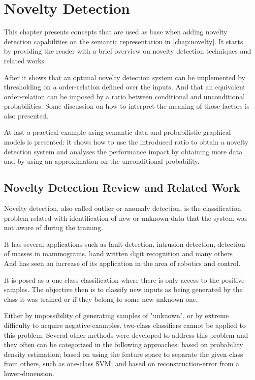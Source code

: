 \chapter{Novelty Detection}\label{chap:novelty-intro}

This chapter presents concepts that are used as base when adding novelty
detection capabilities on the semantic representation in \autoref{chap:novelty}.
It starts by providing the reader with a brief overview on novelty detection
techniques and related works.

After it shows that an optimal novelty detection system can be implemented by
thresholding on a order-relation defined over the inputs.
And that an equivalent order-relation can be imposed by a ratio between
conditional and unconditional probabilities.
Some discussion on how to interpret the meaning of those factors is also
presented.

At last a practical example using semantic data and probabilistic graphical
models is presented: it shows how to use the introduced ratio to obtain a
novelty detection system and analyses the performance impact by obtaining more
data and by using an approximation on the unconditional probability.


\section{Novelty Detection Review and Related Work}
%
%
%

Novelty detection, also called outlier or anomaly detection, is the
classification problem related with identification of new or unknown data that
the system was not aware of during the training.

It has several applications such as fault detection, intrusion detection,
detection of masses in mammograms, hand written digit recognition and many
others~\citep{markou2003novelty}.
And has seen an increase of its application in the area of robotics and control.

It is posed as a one class classification where there is only access to the
positive samples. The objective then is to classify new inputs as being
generated by the class it was trained or if they belong to some new unknown one.

Either by impossibility of generating samples of "unknown", or by extreme
difficulty to acquire negative-examples, two-class classifiers cannot be
applied to this problem.
Several other methods were developed to address this problem and they often can
be categorized in the following approaches:
based on probability density estimation;
based on using the feature space to separate the given class from others, such as one-class \gls{SVM};
and based on reconstruction-error from a lower-dimension.



